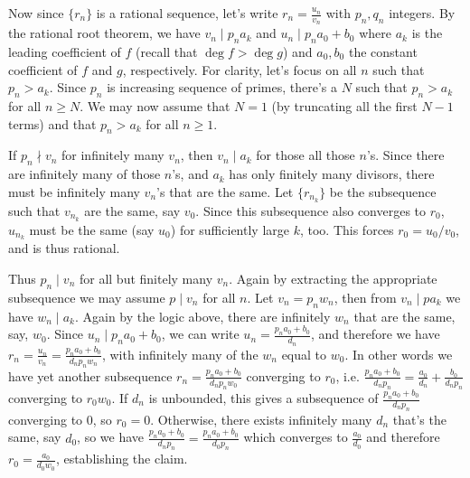 \documentclass[11pt,a4paper]{article}
\begin{document}
\begin{enumerate}
	Now since $\{r_n\}$ is a rational sequence, let's write $r_n=\frac{u_n}{v_n}$ with $p_n, q_n$ integers. By the rational root theorem, we have $v_n\mid p_na_k$ and $u_n\mid p_na_0+b_0$ where $a_k$ is the leading coefficient of $f$ (recall that $\deg f > \deg g$) and $a_0, b_0$ the constant coefficient of $f$ and $g$, respectively. 
	For clarity, let's focus on all $n$ such that $p_n>a_k$. Since $p_n$ is increasing sequence of primes, there's a $N$ such that $p_n>a_k$ for all $n\ge N$. We may now assume that $N=1$ (by truncating all the first $N-1$ terms) and that $p_n>a_k$ for all $n\ge 1$. 
	
	If $p_n\nmid v_n$ for infinitely many $v_n$, then $v_n\mid a_k$ for those all those $n$'s. Since there are infinitely many of those $n$'s, and $a_k$ has only finitely many divisors, there must be infinitely many $v_n$'s that are the same. Let $\{r_{n_k}\}$ be the subsequence such that $v_{n_k}$ are the same, say $v_0$. Since this subsequence also converges to $r_0$, $u_{n_k}$ must be the same (say $u_0$) for sufficiently large $k$, too. This forces $r_0=u_0/v_0$, and is thus rational. 
	
	Thus $p_n\mid v_n$ for all but finitely many $v_n$. Again by extracting the appropriate subsequence we may assume $p\mid v_n$ for all $n$. Let $v_n=p_nw_n$, then from $v_n\mid pa_k$ we have $w_n\mid a_k$. Again by the logic above, there are infinitely $w_n$ that are the same, say, $w_0$. Since $u_n\mid p_na_0+b_0$, we can write $u_n= \frac{p_na_0+b_0}{d_n}$, and therefore we have $r_n=\frac{u_n}{v_n}=\frac{p_na_0+b_0}{d_np_nw_n}$, with infinitely many of the $w_n$ equal to $w_0$. In other words we have yet another subsequence $r_n=\frac{p_na_0+b_0}{d_np_nw_0}$ converging to $r_0$, i.e. $\frac{p_na_0+b_0}{d_np_n}=\frac{a_0}{d_n}+\frac{b_0}{d_np_n}$ converging to $r_0w_0$. 
	If $d_n$ is unbounded, this gives a subsequence of $\frac{p_na_0+b_0}{d_np_n}$ converging to 0, so $r_0=0$. Otherwise, there exists infinitely many $d_n$ that's the same, say $d_0$, so we have $\frac{p_na_0+b_0}{d_np_n}=\frac{p_na_0+b_0}{d_0p_n}$ which converges to $\frac{a_0}{d_0}$ and therefore $r_0=\frac{a_0}{d_0w_0}$, establishing the claim. 
	\end{enumerate}
	
\end{document}
